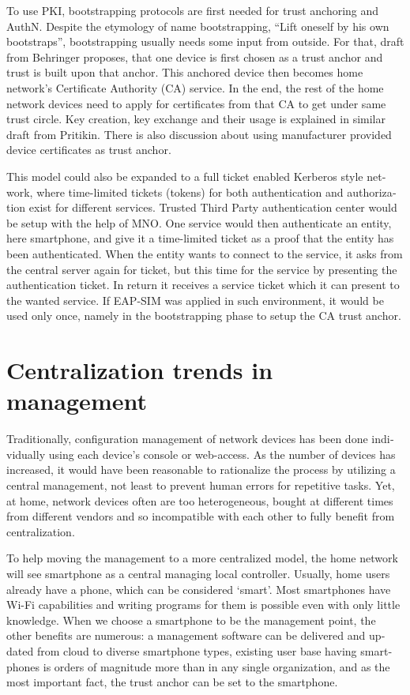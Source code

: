 \documentclass[12pt,a4paper,english]{tutthesis}
\begin{document}
\begin{otherlanguage}{english}
To use PKI, bootstrapping protocols are first needed for trust
anchoring and AuthN.  Despite the etymology of name bootstrapping,
``Lift oneself by his own bootstraps'', bootstrapping usually needs
some input from outside.
For that, draft from Behringer\cite{draft-behringer-bootstrap} proposes,
that one device is first chosen as a trust anchor and trust is
built upon that anchor. This anchored device then becomes home network's
Certificate Authority (CA) service. In the end, the rest of the home network 
devices need to apply for certificates from that CA to get under same
trust circle.
Key creation, key exchange and their usage is explained in similar
draft from Pritikin\cite{draft-pritikin-bootstrap}. There is also discussion about using
manufacturer provided device certificates as trust anchor.  



This model could also be expanded to a full ticket enabled
Kerberos style network, where time-limited tickets (tokens) for
both authentication and authorization exist for different services. Trusted
Third Party authentication center would be setup with the help of MNO.
One service would then authenticate an entity, here smartphone, and
give it a time-limited ticket as a proof that the entity has been authenticated.
When the entity wants to connect to the service, it asks from the central 
server again for ticket, but this time for the service by presenting
the authentication ticket. In return it receives a service ticket which
it can present to the wanted service. 
If EAP-SIM was applied in such environment, it would be used only once, namely in
the bootstrapping phase to setup the CA trust anchor.  
\section{Centralization trends in management}
\label{sec-3-2}

Traditionally, configuration management of network devices has been done
individually using each device's console or web-access.  As the number of
devices has increased, it would have been reasonable to rationalize
the process by utilizing a central management, not least to prevent human
errors for repetitive tasks.  Yet, at home, network devices often are
too heterogeneous, bought at different times from different vendors
and so incompatible with each other to fully benefit from
centralization. 

To help moving the management to a more centralized
model, the home network will see smartphone as a central managing local
controller.
Usually, home users already have a phone, which can be considered 
`smart'. Most smartphones have Wi-Fi capabilities and writing programs
for them is possible even with only little knowledge.
When we choose a smartphone to be the management point, the other benefits are
numerous:  a management software can be delivered and
updated from cloud to diverse smartphone types, existing user
base having smartphones is orders of magnitude more than in any single
organization, and as the most important fact, the trust anchor can be set to the smartphone.


\end{otherlanguage}
\end{document}
